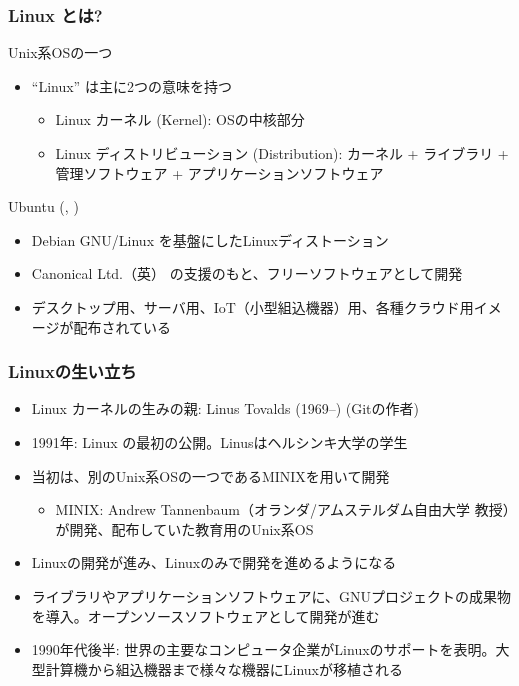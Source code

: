 \documentclass[dvipdfmx]{beamer}
\begin{document}
\begin{frame}
    \frametitle{Linux とは? \cite{linuxfoundation}}

    \begin{block}{Unix系OSの一つ}
        \begin{itemize}
            \item ``Linux'' は主に2つの意味を持つ
            \begin{itemize}
                \item Linux カーネル (Kernel): OSの中核部分
                \item Linux ディストリビューション (Distribution): カーネル + ライブラリ + 管理ソフトウェア + アプリケーションソフトウェア 
            \end{itemize}
        \end{itemize}
    \end{block}

    \begin{block}{Ubuntu (\cite{ubuntu}, \cite{ubuntu-ja})}
        \begin{itemize}
            \item Debian GNU/Linux を基盤にしたLinuxディストーション
            \item Canonical Ltd.（英） の支援のもと、フリーソフトウェアとして開発
            \item デスクトップ用、サーバ用、IoT（小型組込機器）用、各種クラウド用イメージが配布されている
        \end{itemize}
    \end{block}
\end{frame}

\begin{frame}
    \frametitle{Linuxの生い立ち \cite{kazaana}}

    \begin{itemize}
        \item<1-> Linux カーネルの生みの親: Linus Tovalds (1969--) (Gitの作者)
        \item<2-> 1991年: Linux の最初の公開。Linusはヘルシンキ大学の学生
        \item<3-> 当初は、別のUnix系OSの一つであるMINIXを用いて開発
        \begin{itemize}
            \item<3-> MINIX: Andrew Tannenbaum（オランダ/アムステルダム自由大学 教授）が開発、配布していた教育用のUnix系OS
        \end{itemize}
        \item<4-> Linuxの開発が進み、Linuxのみで開発を進めるようになる
        \item<5-> ライブラリやアプリケーションソフトウェアに、GNUプロジェクトの成果物を導入。オープンソースソフトウェアとして開発が進む
        \item<6-> 1990年代後半: 世界の主要なコンピュータ企業がLinuxのサポートを表明。大型計算機から組込機器まで様々な機器にLinuxが移植される
    \end{itemize}
\end{frame}
\end{document}
